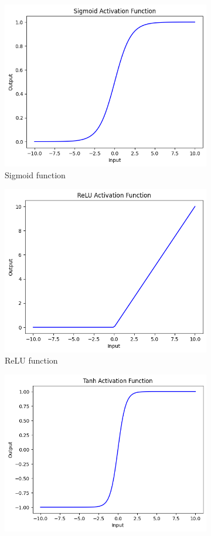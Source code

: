 \begin{figure}[h]
	\centering
	\begin{subfigure}{.33\textwidth}
		\centering
		\includegraphics[width=0.8\linewidth]{ImageFiles/NeuralNetworks/sigmoid}
		\caption{Sigmoid function}
		\label{fig:sigmoid}
	\end{subfigure}%
	\begin{subfigure}{.33\textwidth}
		\centering
		\includegraphics[width=0.8\linewidth]{ImageFiles/NeuralNetworks/relu}
		\caption{ReLU function}
		\label{fig:relu}
	\end{subfigure}%
	\begin{subfigure}{.33\textwidth}
		\centering
		\includegraphics[width=0.8\linewidth]{ImageFiles/NeuralNetworks/tanh}

\end{subfigure}
\end{figure}
